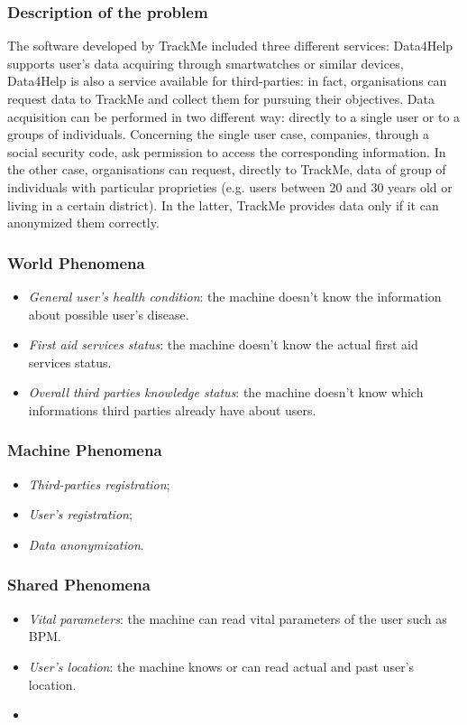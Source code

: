 \documentclass{article}
\begin{document}
\subsubsection{Description of the problem}
The software developed by TrackMe included three different services: Data4Help supports user's data acquiring through smartwatches or similar devices, 
Data4Help is also a service available for third-parties: in fact, organisations can request data to TrackMe and collect them for pursuing their objectives.
Data acquisition can be performed in two different way: directly to a single user or to a groups of individuals.
Concerning the single user case, companies, through a social security code, ask permission to access the corresponding information. 
In the other case, organisations can request, directly to TrackMe, data of group of individuals with particular proprieties (e.g. users between 20 and 30 years old or living in a certain district).
In the latter, TrackMe provides data only if it can anonymized them correctly. 



\subsubsection{World Phenomena}
\begin{itemize}
	\item \textit{General user’s health condition}: the machine doesn’t know the information about possible user’s disease.
	\item \textit{First aid services status}: the machine doesn’t know the actual first aid services status.
	\item \textit{Overall third parties knowledge status}: the machine doesn’t know which informations third parties already have about users.
\end{itemize}

\subsubsection{Machine Phenomena}
\begin{itemize}
	\item \textit{Third-parties registration};
	\item \textit{User's registration};
	\item \textit{Data anonymization}.
\end{itemize}

\subsubsection{Shared Phenomena}
\begin{itemize}
	\item \textit{Vital parameters}: the machine can read vital parameters of the user such as BPM.
	\item \textit{User's location}: the machine knows or can read actual and past user’s location.
	\item 
\end{itemize}
\end{document}
